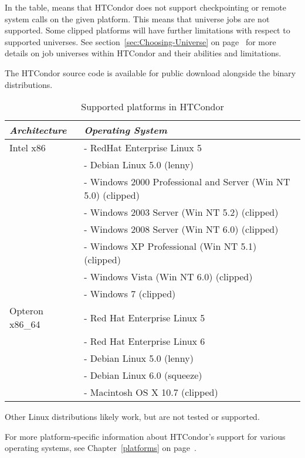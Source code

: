 In the table,  means that HTCondor does not support
checkpointing or remote system calls on the given platform. 
This means that  universe jobs are not supported.
Some clipped platforms will have further limitations with respect
to supported universes.
See section~\ref{sec:Choosing-Universe} on
page~\pageref{sec:Choosing-Universe} for more details on job universes
within HTCondor and their abilities and limitations.

The HTCondor source code is available for 
public download alongside the binary distributions.

\begin{center}
\begin{table}[hbt]
\begin{tabular}{|p{6cm}p{7cm}|} \hline
\emph{Architecture} & \emph{Operating System} \\ \hline \hline
Intel x86 & - RedHat Enterprise Linux 5 \\
 & - Debian Linux 5.0 (lenny) \\
 & - Windows 2000 Professional and Server (Win NT 5.0) (clipped) \\
 & - Windows 2003 Server (Win NT 5.2) (clipped) \\
 & - Windows 2008 Server (Win NT 6.0) (clipped) \\
 & - Windows XP Professional (Win NT 5.1) (clipped) \\
 & - Windows Vista (Win NT 6.0) (clipped) \\
 & - Windows 7 (clipped) \\
Opteron x86\_64 & - Red Hat Enterprise Linux 5 \\ 
 & - Red Hat Enterprise Linux 6 \\
 & - Debian Linux 5.0 (lenny) \\
 & - Debian Linux 6.0 (squeeze) \\ \hline 
 & - Macintosh OS X 10.7 (clipped) \\ \hline
\end{tabular}
\caption{\label{table:supported-platforms}Supported platforms in HTCondor \VersionNotice}
\end{table}
\end{center}


\Note Other Linux distributions likely work, but are not tested
or supported.

For more platform-specific information about HTCondor's support for
various operating systems, see Chapter~\ref{platforms} on
page~\pageref{platforms}. 



